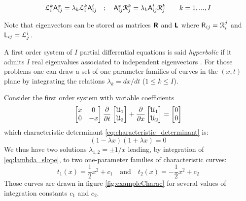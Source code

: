 \begin{equation}
  \label{eq:eigenvectors}
  \mathcal{L}^k_i  \mathsf{A}^x_{ij} = \lambda_k \mathcal{L}^k_i \mathsf{A}^t_{ij} \quad ; \quad \mathsf{A}^x_{ij}\mathcal{R}^k_j = \lambda_k \mathsf{A}^t_{ij}\mathcal{R}^k_j \qquad k=1,...,I
\end{equation}
\begin{remark}
  Note that eigenvectors can be stored as matrices $\boldsymbol{\mathsf{R}}$ and $\boldsymbol{\mathsf{L}}$ where $\mathsf{R}_{ij}=\mathcal{R}^j_i$ and $\mathsf{L}_{ij}=\mathcal{L}_j^i$.
\end{remark}

A first order system of $I$ partial differential equations is said \textit{hyperbolic} if it admits $I$ real eigenvalues associated to independent eigenvectors \cite{Courant}.
For those problems one can draw a set of one-parameter families of curves in the $(x,t)$ plane by integrating the relations $\lambda_k=dx/dt$ ($1 \leq k \leq I$).
\begin{example}
  \label{ex:charac1}
  Consider the first order system with variable coefficients
\begin{equation*}
 \left[\begin{matrix}x &0 \\0 &-x\end{matrix}\right] \frac{\partial }{\partial t} \left[\begin{matrix}\mathcal{U}_1 \\ \mathcal{U}_2\end{matrix}\right] + \frac{\partial }{\partial x}\left[\begin{matrix}\mathcal{U}_1 \\ \mathcal{U}_2\end{matrix}\right] = \left[\begin{matrix}0 \\0\end{matrix}\right]
\end{equation*}
which characteristic determinant \eqref{eq:characteristic_determinant} is:
\begin{equation*}
  (1-\lambda x)(1+\lambda x)=0
\end{equation*}
We thus have two solutions $\lambda_{1,2}=\pm 1/x$ leading, by integration of \eqref{eq:lambda_slope}, to two one-parameter families of characteristic curves:
\begin{equation*}
  t_1(x)=\frac{1}{2}x^2+c_1  \quad \text{and} \quad t_2(x)=-\frac{1}{2}x^2+c_2 
\end{equation*}
Those curves are drawn in figure \ref{fig:exampleCharac} for several values of integration constants $c_1$ and $c_2$.
\end{example}
